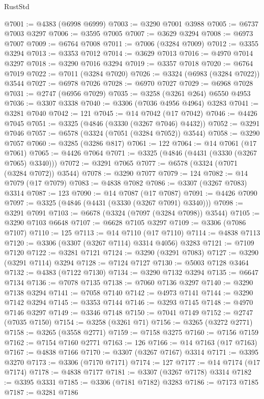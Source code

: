\begin{lexlean}{RustStd}
\begin{coremodule}
@7001 := @4383 (@6998 @6999)
@7003 := @3290 @7001 @3988
@7005 := @6737 @7003 @3297
@7006 := @3595 @7005
@7007 := @3629 @3294
@7008 := @6973 @7007
@7009 := @6764 @7008
@7011 := @7006 (@3284 @7009)
@7012 := @3355 @3294
@7013 := @3353 @7012
@7014 := @3629 @7013
@7016 := @4970 @7014 @3297
@7018 := @3290 @7016 @3294
@7019 := @3357 @7018
@7020 := @6764 @7019
@7022 := @7011 (@3284 @7020)
@7026 := @3324 (@6983 (@3284 @7022)) @3544
@7027 := @6978 @7026
@7028 := @6970 @7027
@7029 := @6968 @7028
@7031 := @2747 (@6956 @7029)
@7035 := @3258 (@3261 @264) @6550 @4953
@7036 := @3307 @3338
@7040 := @3306 (@7036 @4956 @4964) @3283
@7041 := @3281 @7040
@7042 := 121
@7045 := @14 @7042 (@17 @7042)
@7046 := @4426 @7045
@7051 := @3325 (@4846 (@3330 (@3267 @7046) @4432))
@7052 := @3291 @7046
@7057 := @6578 (@3324 (@7051 (@3284 @7052)) @3544)
@7058 := @3290 @7057
@7060 := @3285 (@3286 @817)
@7061 := 122
@7064 := @14 @7061 (@17 @7061)
@7065 := @4426 @7064
@7071 := @3325 (@4846 (@4431 (@3330 (@3267 @7065) @3340)))
@7072 := @3291 @7065
@7077 := @6578 (@3324 (@7071 (@3284 @7072)) @3544)
@7078 := @3290 @7077
@7079 := 124
@7082 := @14 @7079 (@17 @7079)
@7083 := @4838 @7082
@7086 := @3307 (@3267 @7083) @3314
@7087 := 123
@7090 := @14 @7087 (@17 @7087)
@7091 := @4426 @7090
@7097 := @3325 (@4846 (@4431 (@3330 (@3267 @7091) @3340)))
@7098 := @3291 @7091
@7103 := @6678 (@3324 (@7097 (@3284 @7098)) @3544)
@7105 := @3290 @7103 @6648
@7107 := @6628 @7105 @3297
@7109 := @3306 (@7086 @7107)
@7110 := 125
@7113 := @14 @7110 (@17 @7110)
@7114 := @4838 @7113
@7120 := @3306 (@3307 (@3267 @7114) @3314 @4056) @3283
@7121 := @7109 @7120
@7122 := @3281 @7121
@7124 := @3290 (@3291 @7083)
@7127 := @3290 (@3291 @7114) @3294
@7128 := @7124 @7127
@7130 := @5003 @7128 @3464
@7132 := @4383 (@7122 @7130)
@7134 := @3290 @7132 @3294
@7135 := @6647 @7134
@7136 := @7078 @7135
@7138 := @7060 @7136 @3297
@7140 := @3290 @7138 @3294
@7141 := @7058 @7140
@7142 := @4973 @7141
@7144 := @3290 @7142 @3294
@7145 := @3353 @7144
@7146 := @3293 @7145
@7148 := @4970 @7146 @3297
@7149 := @3346 @7148
@7150 := @7041 @7149
@7152 := @2747 (@7035 @7150)
@7154 := @3258 (@3261 @71)
@7156 := @3265 (@3272 @2771)
@7158 := @3265 (@3558 @2771)
@7159 := @7158 @3275
@7160 := @7156 @7159
@7162 := @7154 @7160 @2771
@7163 := 126
@7166 := @14 @7163 (@17 @7163)
@7167 := @4838 @7166
@7170 := @3307 (@3267 @7167) @3314
@7171 := @3395 @3270
@7173 := @3306 (@7170 @7171)
@7174 := 127
@7177 := @14 @7174 (@17 @7174)
@7178 := @4838 @7177
@7181 := @3307 (@3267 @7178) @3314
@7182 := @3395 @3331
@7185 := @3306 (@7181 @7182) @3283
@7186 := @7173 @7185
@7187 := @3281 @7186

\end{coremodule}
\end{lexlean}
